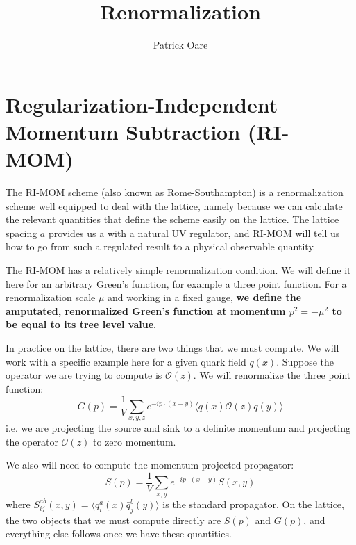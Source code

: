 \documentclass[11pt, oneside]{article}   	%
\title{Renormalization}
\author{Patrick Oare}
\date{}							%
\theoremstyle{definition}
\begin{document}
\maketitle
\section{Regularization-Independent Momentum Subtraction (RI-MOM)}

The RI-MOM scheme (also known as Rome-Southampton) is a renormalization scheme well equipped to deal with 
the lattice, namely because we can calculate the relevant quantities that define the scheme easily on the lattice. The 
lattice spacing $a$ provides us a with a natural UV regulator, and RI-MOM will tell us how to go from such a regulated 
result to a physical observable quantity. 

The RI-MOM has a relatively simple renormalization condition. We will define it here for an arbitrary Green's function, 
for example a three point function. For a renormalization scale $\mu$ and working in a fixed gauge, \textbf{we 
define the amputated, renormalized Green's function at momentum $p^2 = -\mu^2$ to be equal to its tree level 
value}. 

In practice on the lattice, there are two things that we must compute. We will work with a specific example here for a 
given quark field $q(x)$. Suppose the operator we are trying to compute is $\mathcal O(z)$. We will renormalize the 
three point function:
\begin{equation}
	G(p) = \frac{1}{V}\sum_{x, y, z}e^{-ip\cdot (x - y)}\langle q(x)\mathcal O(z) q(y)\rangle
\end{equation}
i.e. we are projecting the source and sink to a definite momentum and projecting the operator $\mathcal O(z)$ to zero 
momentum. 

We also will need to compute the momentum projected propagator:
\begin{equation}
	S(p) = \frac{1}{V}\sum_{x, y}e^{-ip\cdot(x - y)} S(x, y)
\end{equation}
where $S^{ab}_{ij}(x, y) = \langle q^a_i(x)\bar q^b_j(y)\rangle$ is the standard propagator. On the lattice, the two objects that we must compute 
directly are $S(p)$ and $G(p)$, and everything else follows once we have these quantities. 
\end{document}
